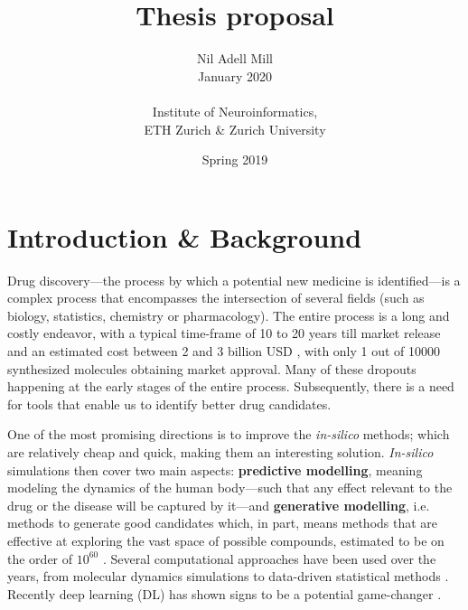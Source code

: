 \documentclass{article}
\begin{document}
\title{\Large Thesis proposal}
\author{Nil Adell Mill \\
        January 2020 \\ \\
        Institute of Neuroinformatics, \\
        ETH Zurich \& Zurich University}
\date{Spring 2019}

\maketitle

    \section*{Introduction \& Background}

Drug discovery---the process by which a potential new medicine is identified---is a
 complex process that encompasses the intersection of several fields (such as biology,
 statistics, chemistry or pharmacology). The entire process is a long and costly
 endeavor, with a typical time-frame of 10 to 20 years till market release and an
 estimated cost between 2 and 3 billion USD \cite{Schneider2019, Scannell2012}, with
 only 1 out of 10000 synthesized molecules obtaining market approval. Many of these
 dropouts happening at the early stages of the entire process.
 {\color{red}Subsequently}, there is a need for tools that enable us to identify better
 drug candidates.

One of the most promising directions is to improve the \emph{in-silico} methods; which
 are relatively cheap and quick, making them an interesting solution. \emph{In-silico}
 simulations then cover two main aspects: \textbf{predictive modelling}, meaning
 modeling the dynamics of the human body---such that any effect relevant to the drug or
 the disease will be captured by it---and \textbf{generative modelling}, i.e. methods to
 generate good candidates which, in part, means methods that are effective at exploring
 the vast space of possible compounds, estimated to be on the order of
 $10^{60}$ \cite{Reymond2012}. Several computational approaches have been used over the
 years, from molecular dynamics simulations to data-driven statistical methods
 \cite{Hung2014, Kuhn2016}. Recently deep learning (DL) has shown signs to be a
 potential game-changer \cite{Dargan2019}. 
 
\end{document}
